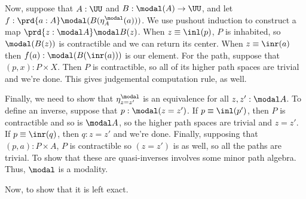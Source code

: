 Now, suppose that $A : \UU$ and $B : \modal(A) \to \UU$, and let $f : \prd{a:A}
\modal(B(\eta^{\modal}_{A}(a)))$.  We use pushout induction to construct a map
$\prd{z:\modal A} \modal B(z)$.  When $z \equiv \inl(p)$, $P$ is inhabited, so
$\modal (B (z))$ is contractible and we can return its center.  When $z \equiv
\inr(a)$ then $f(a) : \modal(B(\inr(a)))$ is our element.  For the path,
suppose that $(p, x) : P \times X$.  Then $P$ is contractible, so all of its
higher path spaces are trivial and we're done.  This gives judgemental
computation rule, as well.


Finally, we need to show that $\eta^{\modal}_{z = z'}$ is an equivalence for
all $z, z' : \modal A$.  To define an inverse, suppose that $p : \modal(z =
z')$.  If $p \equiv \inl(p')$, then $P$ is contractible and so is $\modal A$,
so the higher path spaces are trivial and $z = z'$.  If $p \equiv \inr(q)$,
then $q : z = z'$ and we're done.  Finally, supposing that $(p, a) : P \times
A$, $P$ is contractible so $(z = z')$ is as well, so all the paths are trivial.
To show that these are quasi-inverses involves some minor path algebra.  Thus,
$\modal$ is a modality.


Now, to show that it is left exact.


